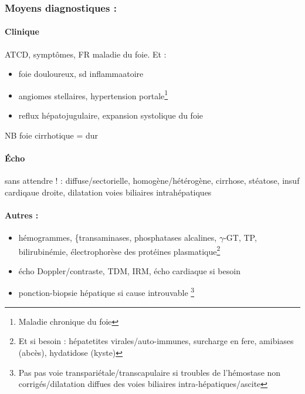 \documentclass[11pt]{article}
\begin{document}
\subsubsection{Moyens diagnostiques :}
\label{sec:org2844cfa}
\paragraph{Clinique}
\label{sec:orge92f6e0}
ATCD, symptômes, FR maladie du foie. Et :
\begin{itemize}
\item foie douloureux, sd inflammaatoire
\item angiomes stellaires, hypertension portale\footnote{Maladie chronique du foie}
\item reflux hépatojugulaire, expansion systolique du foie
\end{itemize}
NB foie cirrhotique = dur

\paragraph{Écho}
\label{sec:orgf9a7293}
sans attendre ! : diffuse/sectorielle, homogène/hétérogène, cirrhose,
stéatose, insuf cardiqaue droite, dilatation voies biliaires intrahépatiques

\paragraph{Autres :}
\label{sec:orga548179}
\begin{itemize}
\item hémogrammes, \{transaminases, phosphatases alcalines, \(\gamma\)-GT, TP,
bilirubinémie, électrophorèse des protéines plasmatique\footnote{Et si besoin : hépatetites virales/auto-immunes, surcharge en fere,
amibiases (abcès), hydatidose (kyste)}
\item écho Doppler/contraste, TDM, IRM, écho cardiaque si besoin
\item ponction-biopsie hépatique si cause introuvable \footnote{Pas pas voie transpariétale/transcapulaire si troubles de l'hémostase
non corrigés/dilatation diffues des voies biliaires intra-hépatiques/ascite}
\end{itemize}
\end{document}
